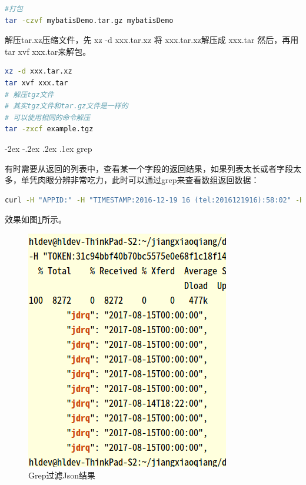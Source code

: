 \documentclass[12pt]{book}
\makeatletter
\numberwithin{dummy}{section}
\theoremstyle{ocrenumbox}
\theoremstyle{blacknumex}
\theoremstyle{blacknumbox}
\theoremstyle{ocrenum}
\renewcommand\paragraph{\@startsection{paragraph}{4}{\z@}
	{-2ex \@plus-.2ex \@minus .2ex}
	{.1ex}
	{\normalfont\small\sffamily\bfseries}}
\makeatother
\begin{document}
\begin{lstlisting}[language=Bash]
#打包
tar -czvf mybatisDemo.tar.gz mybatisDemo
\end{lstlisting}

解压tar.xz压缩文件，先 xz -d xxx.tar.xz 将 xxx.tar.xz解压成 xxx.tar 然后，再用 tar xvf xxx.tar来解包。


\begin{lstlisting}[language=Bash]
xz -d xxx.tar.xz
tar xvf xxx.tar
# 解压tgz文件
# 其实tgz文件和tar.gz文件是一样的
# 可以使用相同的命令解压	
tar -zxcf example.tgz
\end{lstlisting}

\paragraph{grep}

有时需要从返回的列表中，查看某一个字段的返回结果，如果列表太长或者字段太多，单凭肉眼分辨非常吃力，此时可以通过grep来查看数组返回数据：

\begin{lstlisting}[language=Bash]
curl -H "APPID:" -H "TIMESTAMP:2016-12-19 16 (tel:2016121916):58:02" -H "ECHOSTR:" -H "TOKEN:" http://10.10.1.12:28080/api/xzxk?xdr= | jq '.' |grep jdrq
\end{lstlisting}

效果如图\ref{fig:grepfilterreturnvalue}所示。

\begin{figure}[htbp]
	\centering
	\includegraphics[scale=0.5]{grepfilterreturnvalue.png}
	\caption{Grep过滤Json结果}
	\label{fig:grepfilterreturnvalue}
\end{figure}
\end{document}
